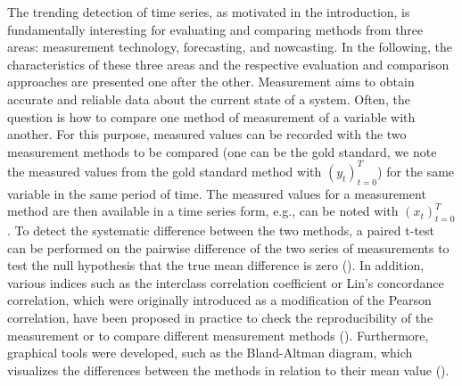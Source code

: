 
The trending detection of time series, as motivated in the introduction, is fundamentally interesting for evaluating and comparing methods from three areas: measurement technology, forecasting, and nowcasting. In the following, the characteristics of these three areas and the respective evaluation and comparison approaches are presented one after the other.
Measurement aims to obtain accurate and reliable data about the current state of a system.
Often, the question is how to compare one method of measurement of a variable with another.
For this purpose, measured values can be recorded with the two measurement methods to be compared (one can be the gold standard, we note the measured values from the gold standard method with $(y_t)^T_{t=0}$) for the same variable in the same period of time. 
The measured values for a measurement method are then available in a time series form, e.g., can be noted with $(x_t)^T_{t=0}$. 
To detect the systematic difference between the two methods, a paired t-test can be performed on the pairwise difference of the two series of measurements to test the null hypothesis that the true mean difference is zero (\cite{watson2010method}).
In addition, various indices such as the interclass correlation coefficient or Lin's concordance correlation, which were originally introduced as a modification of the Pearson correlation, have been proposed in practice to check the reproducibility of the measurement or to compare different measurement methods (\cite{lawrence1989concordance,koo2016guideline,}). 
Furthermore, graphical tools were developed, such as the Bland-Altman diagram, which visualizes the differences between the methods in relation to their mean value (\cite{bland1986statistical}).

